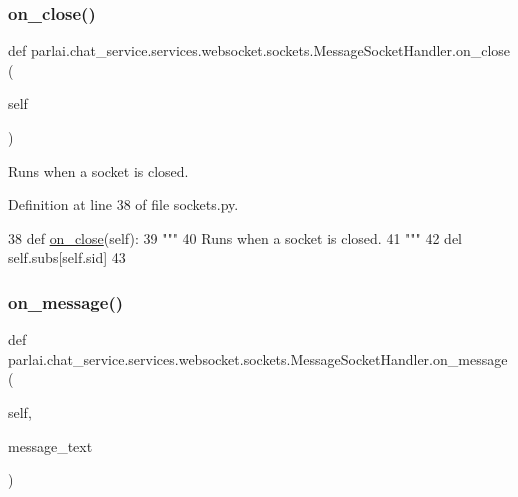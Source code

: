 \subsubsection{\texorpdfstring{on\+\_\+close()}{on\_close()}}
{\footnotesize\ttfamily def parlai.\+chat\+\_\+service.\+services.\+websocket.\+sockets.\+Message\+Socket\+Handler.\+on\+\_\+close (\begin{DoxyParamCaption}\item[{}]{self }\end{DoxyParamCaption})}

\begin{DoxyVerb}Runs when a socket is closed.
\end{DoxyVerb}
 

Definition at line 38 of file sockets.\+py.


\begin{DoxyCode}
38     \textcolor{keyword}{def }\hyperlink{namespaceparlai_1_1chat__service_1_1services_1_1terminal__chat_1_1client_a02c04f40cfa11defbf5c83bbe46aba00}{on\_close}(self):
39         \textcolor{stringliteral}{"""}
40 \textcolor{stringliteral}{        Runs when a socket is closed.}
41 \textcolor{stringliteral}{        """}
42         del self.subs[self.sid]
43 
\end{DoxyCode}
\mbox{\label{classparlai_1_1chat__service_1_1services_1_1websocket_1_1sockets_1_1MessageSocketHandler_a6e45176bf280b1c9b90b93f933af5e00}} 
\subsubsection{\texorpdfstring{on\+\_\+message()}{on\_message()}}
{\footnotesize\ttfamily def parlai.\+chat\+\_\+service.\+services.\+websocket.\+sockets.\+Message\+Socket\+Handler.\+on\+\_\+message (\begin{DoxyParamCaption}\item[{}]{self,  }\item[{}]{message\+\_\+text }\end{DoxyParamCaption})}

